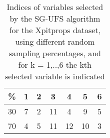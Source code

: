 \begin{table}
	\begin{center}
		\begin{tabular}{c c c c c c c}
			\% & 1 & 2 & 3 & 4 & 5 & 6 \\
			\hline
			30 & 7 & 2 & 11 & 4 & 9 & 5 \\
			70 & 4 & 5 & 11 & 12 & 10 & 3 \\
		\end{tabular}
	\end{center}
	\caption{Indices of variables selected by the SG-UFS algorithm for the Xpitprops dataset, using different random sampling percentages, and for k = 1,..,6 the kth selected variable is indicated}
\end{table}